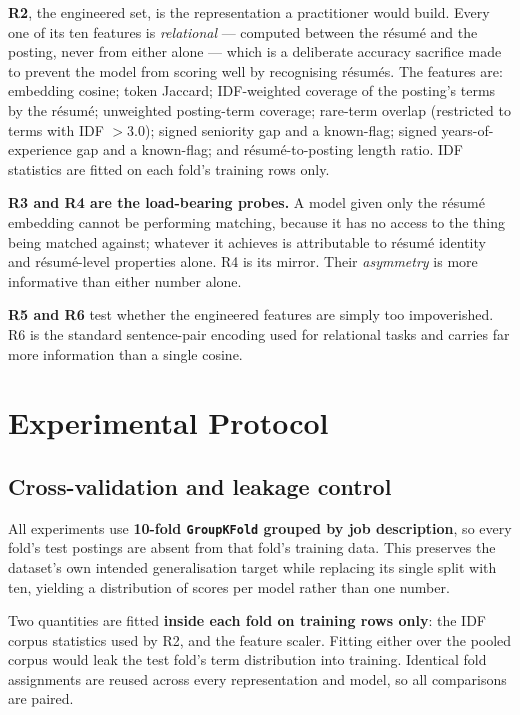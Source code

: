 \documentclass[11pt]{article}                      %
\begin{document}
\textbf{R2}, the engineered set, is the representation a practitioner would
build. Every one of its ten features is \emph{relational} --- computed between the
résumé and the posting, never from either alone --- which is a deliberate accuracy
sacrifice made to prevent the model from scoring well by recognising résumés. The
features are: embedding cosine; token Jaccard; IDF-weighted coverage of the
posting's terms by the résumé; unweighted posting-term coverage; rare-term
overlap (restricted to terms with IDF $> 3.0$); signed seniority gap and a
known-flag; signed years-of-experience gap and a known-flag; and
résumé-to-posting length ratio. IDF statistics are fitted on each fold's training
rows only.

\textbf{R3 and R4 are the load-bearing probes.} A model given only the résumé
embedding cannot be performing matching, because it has no access to the thing
being matched against; whatever it achieves is attributable to résumé identity
and résumé-level properties alone. R4 is its mirror. Their \emph{asymmetry} is
more informative than either number alone.

\textbf{R5 and R6} test whether the engineered features are simply too
impoverished. R6 is the standard sentence-pair encoding used for relational tasks
and carries far more information than a single cosine.

\section{Experimental Protocol}
\label{sec:protocol}

\subsection{Cross-validation and leakage control}

All experiments use \textbf{10-fold \texttt{GroupKFold} grouped by job
description}, so every fold's test postings are absent from that fold's training
data. This preserves the dataset's own intended generalisation target while
replacing its single split with ten, yielding a distribution of scores per model
rather than one number.

Two quantities are fitted \textbf{inside each fold on training rows only}: the
IDF corpus statistics used by R2, and the feature scaler. Fitting either over the
pooled corpus would leak the test fold's term distribution into training.
Identical fold assignments are reused across every representation and model, so
all comparisons are paired.
\end{document}
